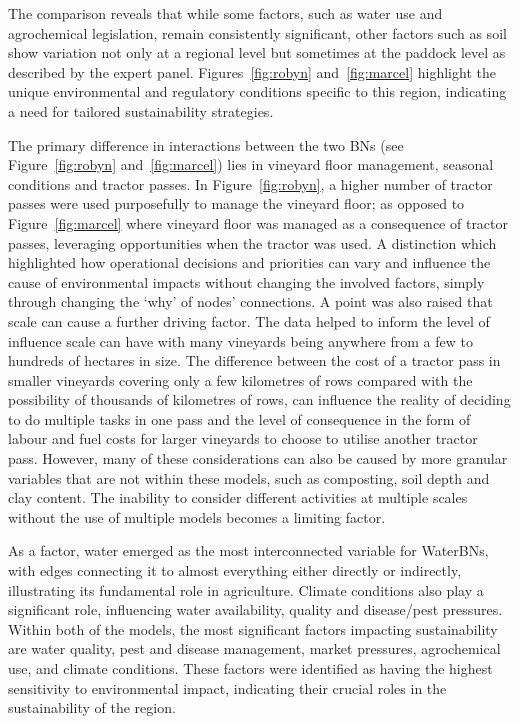 \documentclass[10pt,letterpaper]{article}
\begin{document}
The comparison reveals that while some factors, such as water use and agrochemical legislation, remain consistently significant, other factors such as soil show variation not only at a regional level but sometimes at the paddock level as described by the expert panel. Figures~\ref{fig:robyn} and~\ref{fig:marcel} highlight the unique environmental and regulatory conditions specific to this region, indicating a need for tailored sustainability strategies.

The primary difference in interactions between the two BNs (see Figure~\ref{fig:robyn} and~\ref{fig:marcel}) lies in vineyard floor management, seasonal conditions and tractor passes. In Figure~\ref{fig:robyn}, a higher number of tractor passes were used purposefully to manage the vineyard floor; as opposed to Figure~\ref{fig:marcel} where vineyard floor was managed as a consequence of tractor passes, leveraging opportunities when the tractor was used. A distinction which highlighted how operational decisions and priorities can vary and influence the cause of environmental impacts without changing the involved factors, simply through changing the `why' of nodes' connections. A point was also raised that scale can cause a further driving factor. The data helped to inform the level of influence scale can have with many vineyards being anywhere from a few to hundreds of hectares in size. The difference between the cost of a tractor pass in smaller vineyards covering only a few kilometres of rows compared with the possibility of thousands of kilometres of rows, can influence the reality of deciding to do multiple tasks in one pass and the level of consequence in the form of labour and fuel costs for larger vineyards to choose to utilise another tractor pass. However, many of these considerations can also be caused by more granular variables that are not within these models, such as composting, soil depth and clay content. The inability to consider different activities at multiple scales without the use of multiple models becomes a limiting factor.


As a factor, water emerged as the most interconnected variable for WaterBNs, with edges connecting it to almost everything either directly or indirectly, illustrating its fundamental role in agriculture. Climate conditions also play a significant role, influencing water availability, quality and disease/pest pressures. Within both of the models, the most significant factors impacting sustainability are water quality, pest and disease management, market pressures, agrochemical use, and climate conditions. These factors were identified as having the highest sensitivity to environmental impact, indicating their crucial roles in the sustainability of the region.
\end{document}
